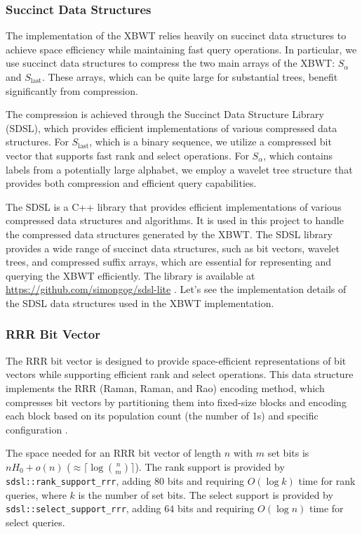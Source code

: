 \subsubsection{Succinct Data Structures}
The implementation of the XBWT relies heavily on succinct data structures to achieve space efficiency while maintaining fast query operations. In particular, we use succinct data structures to compress the two main arrays of the XBWT: $S_\alpha$ and $S_{\text{last}}$. These arrays, which can be quite large for substantial trees, benefit significantly from compression.

The compression is achieved through the Succinct Data Structure Library (SDSL), which provides efficient implementations of various compressed data structures. For $S_{\text{last}}$, which is a binary sequence, we utilize a compressed bit vector that supports fast rank and select operations. For $S_\alpha$, which contains labels from a potentially large alphabet, we employ a wavelet tree structure that provides both compression and efficient query capabilities.

The SDSL is a C++ library that provides efficient implementations of various compressed data structures and algorithms. It is used in this project to handle the compressed data structures generated by the XBWT. The SDSL library provides a wide range of succinct data structures, such as bit vectors, wavelet trees, and compressed suffix arrays, which are essential for representing and querying the XBWT efficiently. The library is available at \url{https://github.com/simongog/sdsl-lite} \cite{gbmp2014sea}. Let's see the implementation details of the SDSL data structures used in the XBWT implementation.

\subsubsection{RRR Bit Vector}
The RRR bit vector is designed to provide space-efficient representations of bit vectors while supporting efficient rank and select operations. This data structure implements the RRR (Raman, Raman, and Rao) encoding method, which compresses bit vectors by partitioning them into fixed-size blocks and encoding each block based on its population count (the number of 1s) and specific configuration \cite{raman2002succinct}. 

The space needed for an RRR bit vector of length $n$ with $m$ set bits is $nH_0 + o(n)$ ($\approx \lceil \log \binom{n}{m} \rceil$). 
The rank support is provided by \texttt{sdsl::rank\_support\_rrr}, adding $80$ bits and requiring $O(\log k)$ time for rank queries, where $k$ is the number of set bits. The select support is provided by \texttt{sdsl::select\_support\_rrr}, adding $64$ bits and requiring $O(\log n)$ time for select queries.


